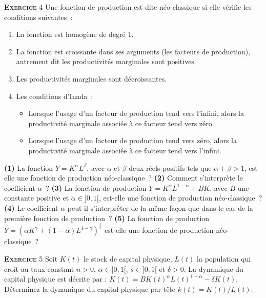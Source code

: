 \documentclass[10pt,a4paper,notitlepage]{article}
\newcommand{\exercice}[1]{\textsc{\textbf{Exercice}} #1}
\newcommand{\question}[1]{\textbf{(#1)}}
\begin{document}
\exercice{4} Une fonction de production est dite néo-classique si elle
vérifie les conditions suivantes :
\begin{enumerate}
\item La fonction est homogène de degré 1.
\item La fonction  est croissante dans ses arguments  (les facteurs de
  production),  autrement   dit  les  productivités   marginales  sont
  positives.
\item Les productivités marginales sont décroissantes.
\item Les conditions d'Inada : 
\begin{itemize}
\item Lorsque l'usage  d'un facteur de production  tend vers l'infini,
  alors  la productivité  marginale associée  à ce  facteur tend  vers
  zéro.
\item Lorsque l'usage d'un facteur de production tend vers zéro, alors
  la productivité marginale associée à ce facteur tend vers l'infini.
\end{itemize}
\end{enumerate}
\question{1}  La fonction  $Y=K^{\alpha}L^{\beta}$,  avec $\alpha$  et
$\beta$ deux réels positifs tels  que $\alpha+\beta > 1$, est-elle une
fonction   de   production   néo-classique ?    \question{2}   Comment
s'interprète  le coefficient  $\alpha$ ? \question{3}  La fonction  de
production  $Y=K^{\alpha}L^{1-\alpha}+BK$,  avec   $B$  une  constante
positive et  $\alpha \in ]0,1[$,  est-elle une fonction  de production
néo-classique ?    \question{4}   Le  coefficient   $\alpha$   peut-il
s'interprêter de la même façon que dans le cas de la première fonction
de    production ?    \question{5}    La   fonction    de   production
$Y=\left(\alpha
  K^{\gamma}+(1-\alpha)L^{1-\gamma}\right)^{\frac{1}{\gamma}}$
est-elle une fonction de production néo-classique ?\newline

\exercice{5}  Soit $K(t)$  le  stock de  capital  physique, $L(t)$  la
population qui  croît au taux  constant $n>0$, $\alpha \in  ]0,1[$, $s
\in  ]0,1[$  et $\delta>0$.   La  dynamique  du capital  physique  est
décrite par  : $\dot{K}(t)=BK(t)^{\alpha}L(t)^{1-\alpha}-\delta K(t)$.
Déterminez la dynamique du capital physique par tête $k(t)=K(t)/L(t)$.
\end{document}
